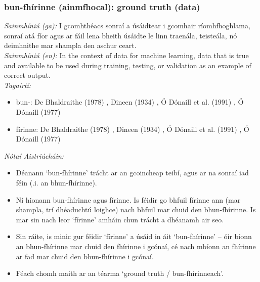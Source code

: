 \subsubsection*{bun-fhírinne (ainmfhocal): ground truth (data)}
 \noindent \textit{Sainmhíniú (ga):} I gcomhthéacs sonraí a úsáidtear i gcomhair ríomhfhoghlama, sonraí atá fíor agus ar fáil lena bheith úsáidte le linn traenála, teisteála, nó deimhnithe mar shampla den aschur ceart.
\\
 \noindent \textit{Sainmhíniú (en):} In the context of data for machine learning, data that is true and available to be used during training, testing, or validation as an example of correct output.
\\
 \noindent \textit{Tagairtí:}
\begin{itemize}
	\item bun-: De Bhaldraithe (1978) \cite{de-bhaldraithe}, Dineen (1934) \cite{dineen}, Ó Dónaill et al. (1991) \cite{focloir-beag}, Ó Dónaill (1977) \cite{odonaill}
	\item fírinne: De Bhaldraithe (1978) \cite{de-bhaldraithe}, Dineen (1934) \cite{dineen}, Ó Dónaill et al. (1991) \cite{focloir-beag}, Ó Dónaill (1977) \cite{odonaill}
\end{itemize}

 \noindent \textit{Nótaí Aistriúcháin:}
\begin{itemize}
	\item Déanann `bun-fhírinne' trácht ar an gcoincheap teibí, agus ar na sonraí iad féin (.i. an bhun-fhírinne). 
	\item Ní hionann bun-fhírinne agus fírinne. Is féidir go bhfuil fírinne ann (mar shampla, trí dhéaduchtú loighce) nach bhfuil mar chuid den bhun-fhírinne. Is mar sin nach leor `fírinne' amháin chun trácht a dhéanamh air seo.
	\item Sin ráite, is minic gur féidir `fírinne' a úsáid in áit `bun-fhírinne' -- óir bíonn an bhun-fhírinne mar chuid den fhírinne i gcónaí, cé nach mbíonn an fhírinne ar fad mar chuid den bhun-fhírinne i gcónaí.
	\item Féach chomh maith ar an téarma `ground truth / bun-fhírinneach'.
\end{itemize}


